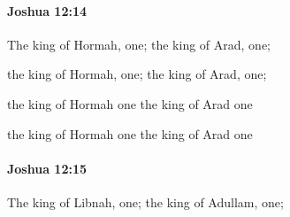 		\paragraph{Joshua 12:14} %
			\label{JOSHUA-12-14}

			The king of Hormah, one; the king of Arad, one;

			\begin{versebox}
					\item[BHS] 
					\item[ASV] the king of Hormah, one; the king of Arad, one;
					\item[NIV] the king of Hormah one the king of Arad one
					\item[NRSV] the king of Hormah one the king of Arad one
			\end{versebox}

		\paragraph{Joshua 12:15} %
			\label{JOSHUA-12-15}

			The king of Libnah, one; the king of Adullam, one;

